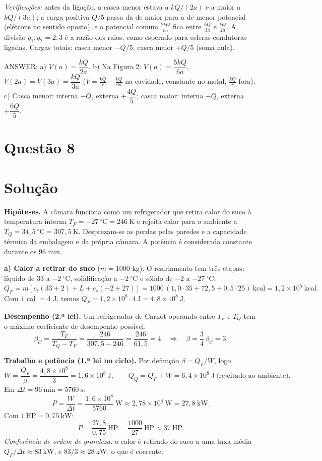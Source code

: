 \documentclass{article}%
\begin{document}
\emph{Verificações:} antes da ligação, a casca menor estava a $kQ/(2a)$ e a maior a $kQ/(3a)$; a carga positiva $Q/5$ passa da de maior para a de menor potencial (elétrons no sentido oposto), e o potencial comum $\frac{2kQ}{5a}$ fica entre $\frac{kQ}{3a}$ e $\frac{kQ}{2a}$. A divisão $q_1:q_2=2:3$ é a razão dos raios, como esperado para esferas condutoras ligadas. Cargas totais: casca menor $-Q/5$, casca maior $+Q/5$ (soma nula).

\noindent ANSWER: a) $V(a)=\dfrac{kQ}{2a}$. b) Na Figura 2: $V(a)=\dfrac{5kQ}{6a}$, $V(2a)=V(3a)=\dfrac{kQ}{3a}$ ($V=\frac{kQ}{r}-\frac{kQ}{6a}$ na cavidade, constante no metal, $\frac{kQ}{r}$ fora). c) Casca menor: interna $-Q$, externa $+\dfrac{4Q}{5}$; casca maior: interna $-Q$, externa $+\dfrac{6Q}{5}$.%
\newpage%
\section*{Questão 8}

\section*{Solução}

\textbf{Hipóteses.} A câmara funciona como um refrigerador que retira calor do suco à temperatura interna $T_F=-27\ ^\circ\mathrm{C}=246\ \mathrm{K}$ e rejeita calor para o ambiente a $T_Q=34{,}5\ ^\circ\mathrm{C}=307{,}5\ \mathrm{K}$. Desprezam-se as perdas pelas paredes e a capacidade térmica da embalagem e da própria câmara. A potência é considerada constante durante os $96$ min.

\textbf{a) Calor a retirar do suco} ($m=1000$ kg). O resfriamento tem três etapas: líquido de $33$ a $-2\ ^\circ$C, solidificação a $-2\ ^\circ$C e sólido de $-2$ a $-27\ ^\circ$C:
\[
Q_F=m\left[c_\ell(33+2)+L+c_s(-2+27)\right]=1000\,(1{,}0\cdot 35+72{,}5+0{,}5\cdot 25)\ \mathrm{kcal}=1{,}2\times 10^{5}\ \mathrm{kcal}.
\]
Com $1$ cal $=4$ J, temos $Q_F=1{,}2\times10^{8}\cdot 4\ \mathrm{J}=4{,}8\times 10^{8}\ \mathrm{J}$.

\textbf{Desempenho (2.ª lei).} Um refrigerador de Carnot operando entre $T_F$ e $T_Q$ tem o máximo coeficiente de desempenho possível:
\[
\beta_C=\frac{T_F}{T_Q-T_F}=\frac{246}{307{,}5-246}=\frac{246}{61{,}5}=4
\quad\Longrightarrow\quad
\beta=\frac{3}{4}\,\beta_C=3 .
\]

\textbf{Trabalho e potência (1.ª lei no ciclo).} Por definição $\beta=Q_F/W$, logo
\[
W=\frac{Q_F}{\beta}=\frac{4{,}8\times10^{8}}{3}=1{,}6\times10^{8}\ \mathrm{J},
\qquad
Q_Q=Q_F+W=6{,}4\times10^{8}\ \mathrm{J}\ \text{(rejeitado ao ambiente)}.
\]
Em $\Delta t=96\ \mathrm{min}=5760\ \mathrm{s}$:
\[
P=\frac{W}{\Delta t}=\frac{1{,}6\times10^{8}}{5760}\ \mathrm{W}\approx 2{,}78\times10^{4}\ \mathrm{W}=27{,}8\ \mathrm{kW}.
\]
Com $1\ \mathrm{HP}=0{,}75\ \mathrm{kW}$:
\[
P=\frac{27{,}8}{0{,}75}\ \mathrm{HP}=\frac{1000}{27}\ \mathrm{HP}\approx 37\ \mathrm{HP}.
\]
\emph{Conferência de ordem de grandeza:} o calor é retirado do suco a uma taxa média $Q_F/\Delta t\approx 83\ \mathrm{kW}$, e $83/3\approx 28\ \mathrm{kW}$, o que é coerente.
\end{document}
